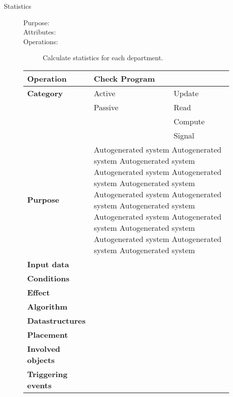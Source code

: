 \begin{description}
\item[Statistics]\hfill
\begin{description}
\item[Purpose:]
\item[Attributes:]
\item[Operations:] Calculate statistics for each department.
\end{description}
\end{description}


\begin{figure}
\begin{tabular}{p{3.5cm} p{4cm} p{4cm}}
\hline
\textbf{Operation}&Check Program\\
\hline
\textbf{Category}&\underline{ }Active&\underline{ }Update\\
&\underline{ }Passive&\underline{ }Read\\
&&\underline{ }Compute\\
&&\underline{ }Signal\\
\textbf{Purpose}&\multicolumn{2}{p{8cm}}{Autogenerated system Autogenerated system Autogenerated system Autogenerated system Autogenerated system Autogenerated system
Autogenerated system Autogenerated system Autogenerated system Autogenerated system Autogenerated system Autogenerated system 
Autogenerated system Autogenerated system Autogenerated system}\\
\textbf{Input data}&\multicolumn{2}{p{8cm}}{}\\
\textbf{Conditions}&\multicolumn{2}{p{8cm}}{}\\
\textbf{Effect}&\multicolumn{2}{p{8cm}}{}\\
\textbf{Algorithm}&\multicolumn{2}{p{8cm}}{}\\
\textbf{Datastructures}&\multicolumn{2}{p{8cm}}{}\\
\textbf{Placement}&\multicolumn{2}{p{8cm}}{}\\
\textbf{Involved objects}&\multicolumn{2}{p{8cm}}{}\\
\textbf{Triggering events}&\multicolumn{2}{p{8cm}}{}\\
\hline
\end{tabular}
\end{figure}
